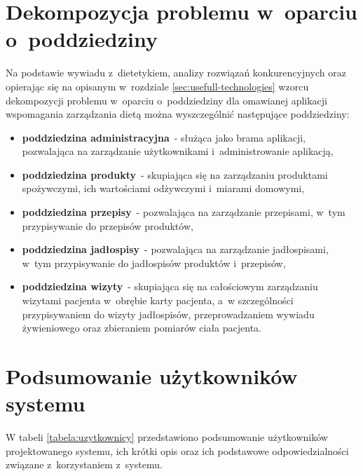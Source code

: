 \section{Dekompozycja problemu w~oparciu o~poddziedziny}\label{sec:problem-decomposition}
\par
Na podstawie wywiadu z~dietetykiem, analizy rozwiązań konkurencyjnych oraz opierając się
na opisanym w~rozdziale \ref{sec:usefull-technologies} wzorcu dekompozycji problemu w~oparciu o~poddziedziny
dla omawianej aplikacji wspomagania zarządzania dietą można wyszczególnić następujące poddziedziny:
\begin{itemize}
    \item \textbf{poddziedzina administracyjna}~- służąca jako brama aplikacji, pozwalająca na zarządzanie użytkownikami i~administrowanie aplikacją,
    \item \textbf{poddziedzina produkty}~- skupiająca się na zarządzaniu produktami spożywczymi, ich wartościami odżywczymi i~miarami domowymi,
    \item \textbf{poddziedzina przepisy}~- pozwalająca na zarządzanie przepisami, w~tym przypisywanie do przepisów produktów,
    \item \textbf{poddziedzina jadłospisy}~- pozwalająca na zarządzanie jadłospisami, w~tym przypisywanie do jadłospisów produktów i~przepisów,
    \item \textbf{poddziedzina wizyty}~- skupiająca się na całościowym zarządzaniu wizytami pacjenta w~obrębie karty pacjenta, a~w szczególności przypisywaniem do wizyty jadłospisów, przeprowadzaniem wywiadu żywieniowego oraz zbieraniem pomiarów ciała pacjenta.
\end{itemize}

\pagebreak
\section{Podsumowanie użytkowników systemu}\label{sec:users-summary}
\par
W tabeli \ref{tabela:uzytkownicy} przedstawiono podsumowanie użytkowników projektowanego systemu, ich krótki opis oraz ich podstawowe odpowiedzialności związane z~korzystaniem z~systemu.

